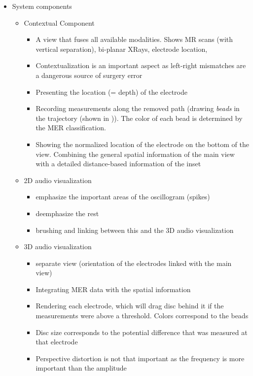 \begin{itemize}
\item System components
\begin{itemize}
    \item Contextual Component
    \begin{itemize}
        \item A  view that fuses all available modalities. Shows MR scans (with vertical separation), bi-planar XRays, electrode location,
        \item Contextualization is an important aspect as left-right mismatches are a dangerous source of surgery error
        \item Presenting the location (= depth) of the electrode
        \item Recording measurements along the removed path (drawing \emph{beads} in the trajectory (shown in \cite{Haese2005} \cite{Miocinovic2007})). The color of each bead is determined by the MER classification.
        \item Showing the normalized location of the electrode on the bottom of the view. Combining the general spatial information of the main view with a detailed distance-based information of the inset
    \end{itemize}
    \item 2D audio visualization
    \begin{itemize}
        \item emphasize the important areas of the oscillogram (spikes)
        \item deemphasize the rest
        \item brushing and linking between this and the 3D audio visualization
    \end{itemize}
    \item 3D audio visualization
    \begin{itemize}
        \item separate view (orientation of the electrodes linked with the main view)
        \item Integrating MER data with the spatial information
        \item Rendering each electrode, which will drag disc behind it if the measurements were above a threshold. Colors correspond to the beads
        \item Disc size corresponds to the potential difference that was measured at that electrode
        \item Perspective distortion is not that important as the frequency is more important than the amplitude
    \end{itemize}

\end{itemize}
\end{itemize}

